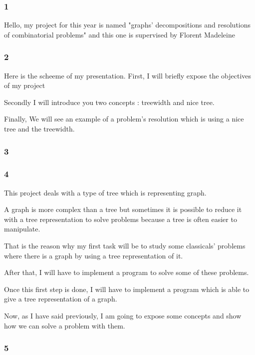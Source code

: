 \documentclass[a4paper, 11pt,french]{article}
\begin{document}
\subsubsection*{ 1 }

Hello,
my project for this year is named "graphs' decompositions and resolutions of combinatorial problems" 
and this one is supervised by Florent Madeleine

\subsubsection*{ 2}

Here is the scheeme of my presentation. 
First, I will briefly expose the objectives of my project

Secondly I will introduce you two concepts : treewidth and nice tree.

Finally, We will see an example of a problem's resolution which is using a nice tree and the treewidth.


\subsubsection*{ 3}



\subsubsection*{ 4}

This project deals with a type of tree which is representing graph.

 A graph is more complex than a tree but sometimes it is possible to reduce it with a tree representation to solve problems because a tree is often easier to manipulate.

That is the reason why my first task will be to study some classicals' problems where there is a graph by using a tree representation of it.

After that, I will have to implement a program to solve some of these problems.

Once this first step is done, I will have to implement a program which is able to give a tree representation of a graph.

Now, as I have said previously, I am going to expose some concepts and show how we can solve a problem with them.



\subsubsection*{ 5}
\end{document}
